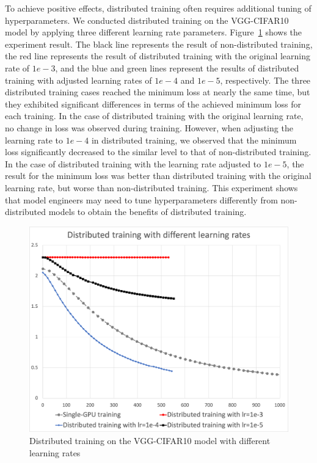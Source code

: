To achieve positive effects, distributed training often requires additional
tuning of hyperparameters.
We conducted distributed training on the VGG-CIFAR10 model by applying three
different learning rate parameters.
Figure~\ref{fig:eval:cifar10} shows the experiment result.
The black line represents the result of non-distributed training, the red line
represents the result of distributed training with the original learning rate
of $1e-3$, and the blue and green lines represent the results of distributed
training with adjusted learning rates of $1e-4$ and $1e-5$, respectively.
The three distributed training cases reached the minimum loss at nearly
the same time, but they exhibited significant differences in terms of the
achieved minimum loss for each training.
In the case of distributed training with the original learning rate, no change
in loss was observed during training. 
However, when adjusting the learning rate to $1e-4$ in distributed training, 
we observed that the minimum loss significantly decreased to the similar level
to that of non-distributed training.
In the case of distributed training with the learning rate adjusted to $1e-5$,
the result for the minimum loss was better than distributed training with the
original learning rate, but worse than non-distributed training.
This experiment shows that model engineers may need to tune hyperparameters
differently from non-distributed models to obtain the benefits of distributed
training.

\begin{figure}%
  \centering
  \includegraphics[width=.5\textwidth]{lr-exp-graph}
  \caption{Distributed training on the VGG-CIFAR10 model with different learning rates}
  \label{fig:eval:cifar10}
\end{figure}


